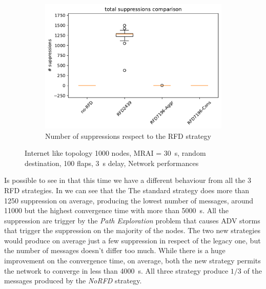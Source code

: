 \begin{figure}[h]
\begin{subfigure}[b]{0.325\textwidth}
     \end{subfigure}
     \hfill
     \begin{subfigure}[b]{0.325\textwidth}
         \centering
         \includegraphics[width=\textwidth]{images/RFD/miceVSelephants/elephants/cisco_1000MRAI30_rfd_comparison_suppressions_boxplot.pdf}
         \caption{Number of suppressions respect to the RFD strategy}
         \label{fig:1000_RFD_MRAI_30_suppressions_elephant}
     \end{subfigure}
		\caption{Internet like topology \num{1000} nodes, \ac{MRAI} = \SI{30}{\second}, random destination, \num{100} flaps, \SI{3}{\second} delay, Network performances}
        \label{fig:1000_RFD_MRAI_30_elephant}
\end{figure}

Is possible to see in  that this time we have
a different behaviour from all the \num{3} \ac{RFD} strategies.
In  we can see that the
The standard strategy does more than \num{1250} suppression on average, producing
the lowest number of messages, around \num{11000} but the highest convergence
time with more than \SI{5000}{\second}.
All the suppression are trigger by the \textit{Path Exploration} problem that
causes \ac{ADV} storms that trigger the suppression on the majority
of the nodes.
The two new strategies would produce on average just a few suppression in respect
of the legacy one, but the number of messages doesn't differ too much.
While there is a huge improvement on the convergence time, on average,
both the new strategy permits the network to converge in less than \SI{4000}{\second}.
All three strategy produce $1/3$ of the messages produced by the
\textit{NoRFD} strategy.

